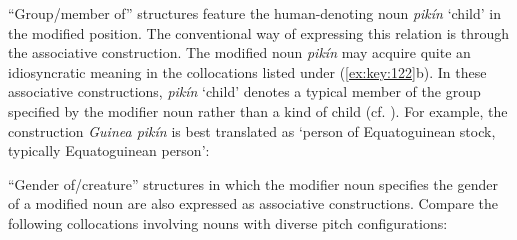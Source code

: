 “Group/member of” structures feature the human-denoting noun \textit{pikín} ‘child’ in the modified position. The conventional way of expressing this relation is through the associative construction. The modified noun \textit{pikín} may acquire quite an idiosyncratic meaning in the collocations listed under (\ref{ex:key:122}b). In these associative constructions, \textit{pikín} ‘child’ denotes a typical member of the group specified by the modifier noun rather than a kind of child (cf. \citealt[91–97]{ClaudiHünnemeyer1991}). For example, the construction \textit{Guinea pikín} is best translated as ‘person of Equatoguinean stock, typically Equatoguinean person’: 

“Gender of/creature” structures in which the modifier noun specifies the gender of a modified noun are also expressed as associative constructions. Compare the following collocations involving nouns with diverse pitch configurations: 

